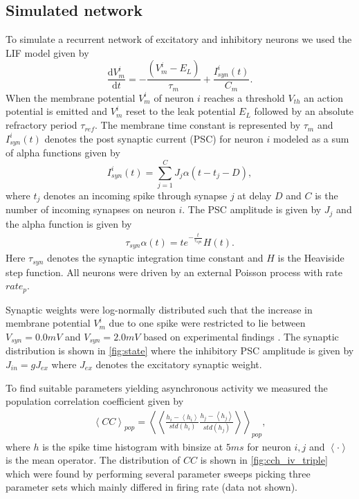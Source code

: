 \documentclass[11pt]{article}
\newcommand{\de}[2]{\frac{\mathrm{d} #1}{\mathrm{d} #2}}
\newcommand{\mean}[1]{\left<{#1}\right>}
\begin{document}
\subsection{Simulated network}
To simulate a recurrent network of excitatory and inhibitory neurons we used the LIF model given by
\begin{equation}
	\de{V_m^i}{t} = - \frac{(V_m^i - E_L)}{\tau_m} + \frac{I_{syn}^i(t)}{C_m}.
    \label{eq:LIF}
\end{equation}
When the membrane potential $ V_m^{i} $ of neuron $ i $ reaches a threshold $ V_{th} $ an action potential is emitted and $ V_m^{i} $ reset to the leak potential $ E_{L} $ followed by an absolute refractory period $ \tau_{ref} $. 
The membrane time constant is represented by $ \tau_{m} $ and $ I_{syn}^{i}(t) $ denotes the post synaptic current (PSC) for neuron $ i $ modeled as a sum of alpha functions given by
\begin{equation}
	\label{eq:syn}
	I_{syn}^i(t) = \sum_{j=1}^C J_j \alpha(t - t_j - D),
\end{equation}
where $ t_j $ denotes an incoming spike through synapse $ j $ at delay $ D $ and $ C $ is the number of incoming synapses on neuron $ i $. 
The PSC amplitude is given by $ J_{j} $ and the alpha function is given by
\begin{align}
\tau_{syn}\alpha(t) = te^{-\frac{t}{\tau_{syn}}} H(t).
\end{align}
Here $ \tau_{syn} $ denotes the synaptic integration time constant and $ H $ is the Heaviside step function. 
All neurons were driven by an external Poisson process with rate $ rate_{p} $.

Synaptic weights were log-normally distributed such that the increase in membrane potential $ V_m^i $ due to one spike were restricted to lie between $ V_{syn} = 0.0 mV $ and $ V_{syn} = 2.0 mV $ based on experimental findings \citep{Sayer1990,Mason1991}. 
The synaptic distribution is shown in \cref{fig:state} where the inhibitory PSC amplitude is given by $ J_{in} = g J_{ex} $ where $ J_{ex} $ denotes the excitatory synaptic weight.

To find suitable parameters yielding asynchronous activity we measured the population correlation coefficient given by
\begin{align}
\mean{CC}_{pop} = \mean{\mean{\frac{h_{i} - \mean{h_{i}}}{std(h_{i})}\frac{h_{j} - \mean{h_{j}}}{std(h_{j})}}}_{pop},
\end{align}
where $ h $ is the spike time histogram with binsize at $ 5ms $ for neuron $ i,j $ and $ \mean{\cdot} $ is the mean operator. 
The distribution of $ CC $ is shown in \cref{fig:cch_iv_triple} which were found by performing several parameter sweeps picking three parameter sets which mainly differed in firing rate (data not shown). 
\end{document}
